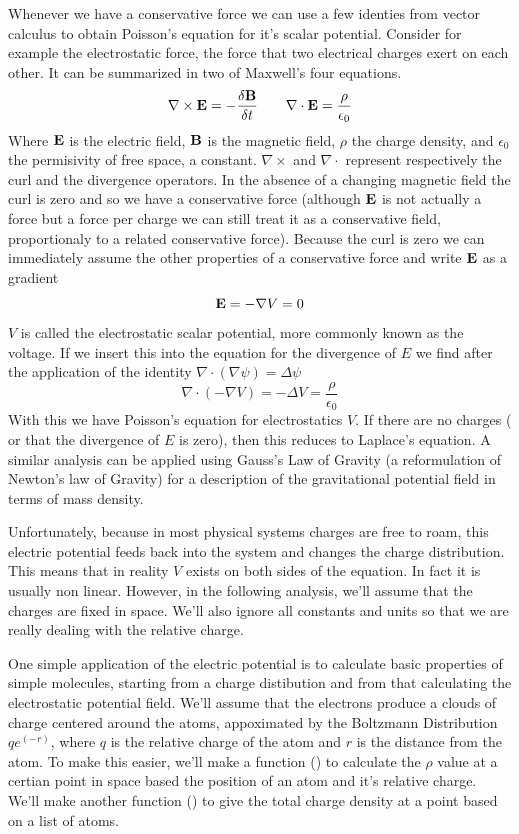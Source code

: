 Whenever we have a conservative force we can use a few identies from vector calculus to obtain Poisson's equation for it's scalar potential. 
Consider for example the electrostatic force, the force that two electrical charges exert on each other. 
It can be summarized in two of Maxwell's four equations.
\[
\nabla \times \bold{E} = -\frac{\delta \bold{B} } {\delta t} \qquad
\nabla \cdot \bold{E} = \frac{\rho}{\epsilon_0}
\]
Where $\bold{E}$ is the electric field, $\bold{B}$ is the magnetic field, $\rho$ the charge density, and $\epsilon_0$ the permisivity of free space, a constant. $\nabla \times$ and $\nabla \cdot$ represent respectively the curl and the divergence operators. In the absence of a changing magnetic field the curl is zero and so we have a conservative force (although $\bold{E}$ is not actually a force but a force per charge we can still treat it as a conservative field, proportionaly to a related conservative force). Because the curl is zero we can immediately assume the other properties of a conservative force and write $\bold{E}$ as a gradient
\[
\bold{E}  = - \nabla V = 0
\]
$V$ is called the electrostatic scalar potential, more commonly known as the voltage. 
If we insert this into the equation for the divergence of $E$ we find after the application of the identity $\nabla \cdot (\nabla\psi) = \Delta \psi$
\[
\nabla \cdot ( - \nabla V) = - \Delta V = \frac {\rho}{\epsilon_0}
\]
With this we have Poisson's equation for electrostatics $V$. 
If there are no charges ( or that the divergence of $E$ is zero), then this reduces to Laplace's equation. 
A similar analysis can be applied using Gauss's Law of Gravity (a reformulation of Newton's law of Gravity) for a description of the gravitational potential field in terms of mass density.

Unfortunately, because in most physical systems charges are free to roam, this electric potential feeds back into the system and changes the charge distribution. 
This means that in reality $V$ exists on both sides of the equation.
In fact it is usually non linear. 
However, in the following analysis, we'll assume that the charges are fixed in space.
We'll also ignore all constants and units so that we are really dealing with the relative charge.

One simple application of the electric potential is to calculate basic properties of simple molecules, starting from a charge distibution and from that calculating the electrostatic potential field.
We'll assume that the electrons produce a clouds of charge centered around the atoms, appoximated by  the Boltzmann Distribution $q e^(-r)$, where $q$ is the relative charge of the atom and $r$ is the distance from the atom. 
To make this easier, we'll make a function () to calculate the $\rho$ value  at a certian point in space based the position of an atom and it's relative charge. 
We'll make another function () to give the total charge density at a point based on a list of atoms.

